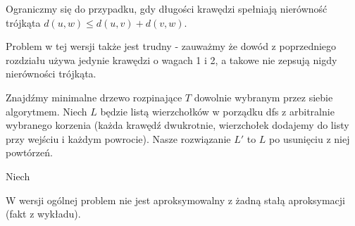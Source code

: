 Ograniczmy się do przypadku, gdy długości krawędzi spełniają nierówność trójkąta $d(u, w) \leqslant d(u, v) + d(v, w)$.

Problem w tej wersji także jest \np{}trudny - zauważmy że dowód z poprzedniego rozdziału używa jedynie krawędzi o wagach 1 i 2, a takowe nie zepsują nigdy nierówności trójkąta.

Znajdźmy minimalne drzewo rozpinające $T$ dowolnie wybranym przez siebie algorytmem. Niech $L$ będzie listą wierzchołków w porządku dfs z arbitralnie wybranego korzenia (każda krawędź dwukrotnie, wierzchołek dodajemy do listy przy wejściu i każdym powrocie). Nasze rozwiązanie $L'$ to $L$ po usunięciu z niej powtórzeń. %

Niech

W wersji ogólnej problem nie jest aproksymowalny z żadną stałą aproksymacji (fakt z wykładu).